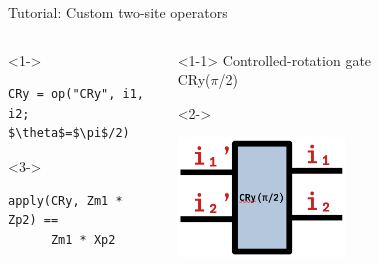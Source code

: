 \begin{frame}[fragile]{Tutorial: Custom two-site operators}

\begin{columns}

\begin{column}{5.5cm}

\begin{onlyenv}<1->
\begin{lstlisting}[language=JuliaLocal, style=julia, mathescape, basicstyle=\small]
CRy = op("CRy", i1, i2; $\theta$=$\pi$/2)
\end{lstlisting}
\end{onlyenv}

\begin{onlyenv}<3->
~\\
\begin{lstlisting}[language=JuliaLocal, style=julia, mathescape, basicstyle=\small]
apply(CRy, Zm1 * Zp2) ==
      Zm1 * Xp2
\end{lstlisting}
\end{onlyenv}

\end{column}

\begin{column}{4.5cm}

\begin{onlyenv}<1-1>
Controlled-rotation gate \\
CRy($\pi$/2)
\end{onlyenv}

\begin{onlyenv}<2->
\vspace*{0.0cm}
\begin{center}
\includegraphics[width=0.5\textwidth]{
  slides/assets/CRy_pi_by_2.png
}
\end{center}
\vspace*{0.0cm}
\end{onlyenv}



\end{column}
\end{columns}
\end{frame}
